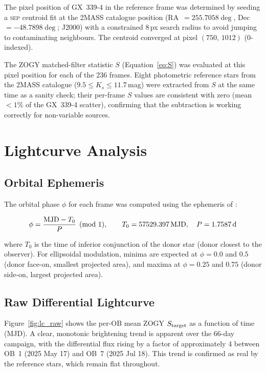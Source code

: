 \documentclass[12pt,a4paper]{article}
\begin{document}
The pixel position of GX~339-4 in the reference frame was determined by
seeding a \textsc{sep} centroid fit at the 2MASS catalogue position
(RA~$= 255.7058\deg$, Dec~$= -48.7898\deg$; J2000) with a constrained $8$\,px
search radius to avoid jumping to contaminating neighbours. The centroid
converged at pixel $(750,\,1012)$ (0-indexed).

The ZOGY matched-filter statistic $S$ (Equation~\ref{eq:S}) was evaluated at
this pixel position for each of the 236 frames. Eight photometric reference
stars from the 2MASS catalogue ($9.5 \leq K_s \leq 11.7$\,mag) were
extracted from $S$ at the same time as a sanity check; their per-frame $S$
values are consistent with zero (mean $< 1\%$ of the GX~339-4 scatter),
confirming that the subtraction is working correctly for non-variable sources.

\section{Lightcurve Analysis}
\label{sec:lightcurve}

\subsection{Orbital Ephemeris}

The orbital phase $\phi$ for each frame was computed using the ephemeris of
\citet{Heida2017}:

\begin{equation}
\phi = \frac{{\rm MJD} - T_0}{P} \pmod{1}, \qquad
T_0 = 57529.397\,{\rm MJD}, \quad P = 1.7587\,{\rm d}
\label{eq:phase}
\end{equation}

where $T_0$ is the time of inferior conjunction of the donor star (donor
closest to the observer). For ellipsoidal modulation, minima are expected at
$\phi = 0.0$ and $0.5$ (donor face-on, smallest projected area), and maxima at
$\phi = 0.25$ and $0.75$ (donor side-on, largest projected area).

\subsection{Raw Differential Lightcurve}

Figure~\ref{fig:lc_raw} shows the per-OB mean ZOGY $S_{\rm target}$ as a
function of time (MJD). A clear, monotonic brightening trend is apparent over
the 66-day campaign, with the differential flux rising by a factor of
approximately 4 between OB~1 (2025 May 17) and OB~7 (2025 Jul 18). This trend
is confirmed as real by the reference stars, which remain flat throughout.
\end{document}
